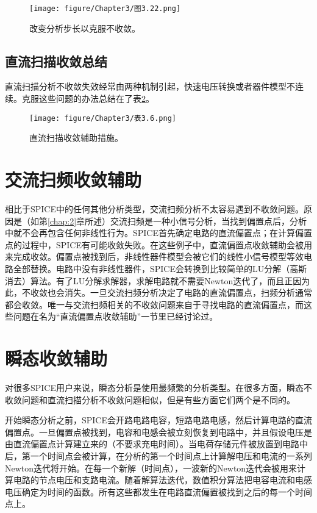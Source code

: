 \begin{figure}[htbp]
\small
    \centering
    \texttt{[image: figure/Chapter3/图3.22.png]}
    \caption{改变分析步长以克服不收敛。}
    \label{图3.22}
\end{figure}

\subsection{直流扫描收敛总结}
直流扫描分析不收敛失效经常由两种机制引起，快速电压转换或者器件模型不连续。克服这些问题的办法总结在了表\ref{表3.6}。
\begin{figure}[htbp]
\small
    \centering
    \texttt{[image: figure/Chapter3/表3.6.png]}
    \caption{直流扫描收敛辅助措施。}
    \label{表3.6}
\end{figure}

\section{交流扫频收敛辅助}
相比于SPICE中的任何其他分析类型，交流扫频分析不太容易遇到不收敛问题。原因是（如第\ref{chap:2}章所述）交流扫频是一种小信号分析，当找到偏置点后，分析中就不会再包含任何非线性行为。SPICE首先确定电路的直流偏置点；在计算偏置点的过程中，SPICE有可能收敛失败。在这些例子中，直流偏置点收敛辅助会被用来完成收敛。偏置点被找到后，非线性器件模型会被它们的线性小信号模型等效电路全部替换。电路中没有非线性器件，SPICE会转换到比较简单的LU分解（高斯消去）算法。有了LU分解求解器，求解电路就不需要Newton迭代了，而且正因为此，不收敛也会消失。一旦交流扫频分析决定了电路的直流偏置点，扫频分析通常都会收敛。唯一与交流扫频相关的不收敛问题来自于寻找电路的直流偏置点，而这些问题在名为“直流偏置点收敛辅助”一节里已经讨论过。

\section{瞬态收敛辅助}
对很多SPICE用户来说，瞬态分析是使用最频繁的分析类型。在很多方面，瞬态不收敛问题和直流扫描分析不收敛问题相似，但是有些方面它们两个是不同的。

开始瞬态分析之前，SPICE会开路电路电容，短路电路电感，然后计算电路的直流偏置点。一旦偏置点被找到，电容和电感会被立刻恢复到电路中，并且假设电压是由直流偏置点计算建立来的（不要求充电时间）。当电荷存储元件被放置到电路中后，第一个时间点会被计算，在分析的第一个时间点上计算解电压和电流的一系列Newton迭代将开始。在每一个新解（时间点），一波新的Newton迭代会被用来计算电路的节点电压和支路电流。随着解算法迭代，数值积分算法把电容电流和电感电压确定为时间的函数。所有这些都发生在电路直流偏置被找到之后的每一个时间点上。

